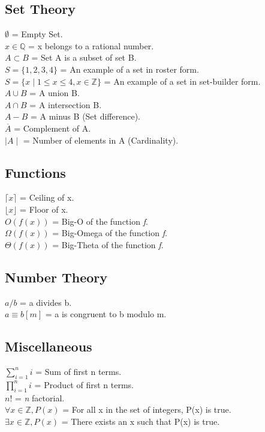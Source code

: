 \subsection{Set Theory}
\indent \indent $\emptyset$ = Empty Set. \\
\indent $ x \in \mathbb{Q}$ = x belongs to a rational number. \\
\indent $A \subset B$ = Set A is a subset of set B. \\
\indent $S = \{1,2,3,4\}$ =  An example of a set in roster form. \\
\indent $S = \{x \mid 1 \leq x \leq 4, x \in \mathbb{Z}\}$ = An example of a
set in set-builder form. \\
\indent $A \cup B$ = A union B.\\
\indent$A \cap B$ = A intersection B.\\
\indent$A - B$ = A minus B (Set difference). \\
\indent$\overline{A}$ = Complement of A. \\
\indent$\mid A \mid$ = Number of elements in A (Cardinality).


\subsection{Functions}
\indent \indent $\lceil x \rceil $ = Ceiling of x. \\
\indent $\lfloor x \rfloor$ = Floor of x.\\
\indent $O(f(x))$ = Big-O of the function \emph{f}.\\
\indent $\Omega(f(x))$ = Big-Omega of the function \emph{f}.\\
\indent $\Theta(f(x))$ = Big-Theta of the function \emph{f}.

\subsection{Number Theory}
\indent \indent $ a / b $ = a divides b. \\
\indent $a \equiv b [m]$ = a is congruent to b modulo m.

\subsection{Miscellaneous}
\indent \indent $\sum_{i = 1} ^ {n} i$ = Sum of first n terms. \\
\indent $\prod_{i = 1} ^ {n} i$ = Product of first n terms.\\
\indent $n!$ = \emph{n} factorial. \\
\indent $\forall x \in \mathbb{Z}, P(x)$ = For all x in the set of integers,
P(x) is true. \\
\indent $ \exists x \in \mathbb{Z}, P(x)$ = There exists an x such that P(x) is
true.

